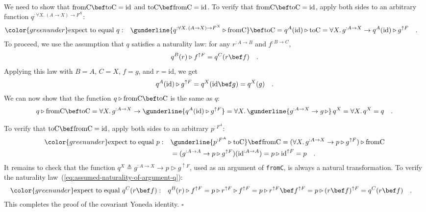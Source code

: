 We need to show that $\text{fromC}\bef\text{toC}=\text{id}$ and $\text{toC}\bef\text{fromC}=\text{id}$.
To verify that $\text{fromC}\bef\text{toC}=\text{id}$, apply both
sides to an arbitrary function $q^{:\forall X.\,(A\rightarrow X)\rightarrow F^{X}}$:
\begin{align*}
{\color{greenunder}\text{expect to equal }q:}\quad & \gunderline{q^{:\forall X.\,(A\rightarrow X)\rightarrow F^{X}}\triangleright\text{fromC}}\bef\text{toC}=q^{A}(\text{id})\triangleright\text{toC}=\forall X.\,g^{:A\rightarrow X}\rightarrow q^{A}(\text{id})\triangleright g^{\uparrow F}\quad.
\end{align*}
To proceed, we use the assumption that $q$ satisfies a naturality
law: for any $r^{:A\rightarrow B}$ and $f^{:B\rightarrow C}$, 
\begin{equation}
q^{B}(r)\triangleright f^{\uparrow F}=q^{C}(r\bef f)\quad.\label{eq:assumed-naturality-of-argument-q}
\end{equation}
Applying this law with $B=A$, $C=X$, $f=g$, and $r=\text{id}$,
we get
\[
q^{A}(\text{id})\triangleright g^{\uparrow F}=q^{X}(\text{id}\bef g)=q^{X}(g)\quad.
\]
We can now show that the function $q\triangleright\text{fromC}\bef\text{toC}$
is the same as $q$:
\[
q\triangleright\text{fromC}\bef\text{toC}=\forall X.\,g^{:A\rightarrow X}\rightarrow\gunderline{q^{A}(\text{id})\triangleright g^{\uparrow F}}=\forall X.\,\gunderline{g^{:A\rightarrow X}\rightarrow g\,\triangleright}\,q^{X}=\forall X.\,q^{X}=q\quad.
\]

To verify that $\text{toC}\bef\text{fromC}=\text{id}$, apply both
sides to an arbitrary $p^{:F^{A}}$:
\begin{align*}
{\color{greenunder}\text{expect to equal }p:}\quad & \gunderline{p^{:F^{A}}\triangleright\text{toC}}\bef\text{fromC}=(\forall X.\,g^{:A\rightarrow X}\rightarrow p\triangleright g^{\uparrow F})\triangleright\text{fromC}\\
 & =(g^{:A\rightarrow A}\rightarrow p\triangleright g^{\uparrow F})(\text{id}^{:A\rightarrow A})=p\triangleright\text{id}^{\uparrow F}=p\quad.
\end{align*}
It remains to check that the function $q^{X}\triangleq g^{:A\rightarrow X}\rightarrow p\triangleright g^{\uparrow F}$,
used as an argument of \lstinline!fromC!,
is always a natural transformation. To verify the naturality law~(\ref{eq:assumed-naturality-of-argument-q}):
\begin{align*}
{\color{greenunder}\text{expect to equal }q^{C}(r\bef f):}\quad & q^{B}(r)\triangleright f^{\uparrow F}=p\triangleright r^{\uparrow F}\triangleright f^{\uparrow F}=p\triangleright r^{\uparrow F}\bef f^{\uparrow F}=p\triangleright(r\bef f)^{\uparrow F}=q^{C}(r\bef f)\quad.
\end{align*}
This completes the proof of the covariant Yoneda identity. $\square$


